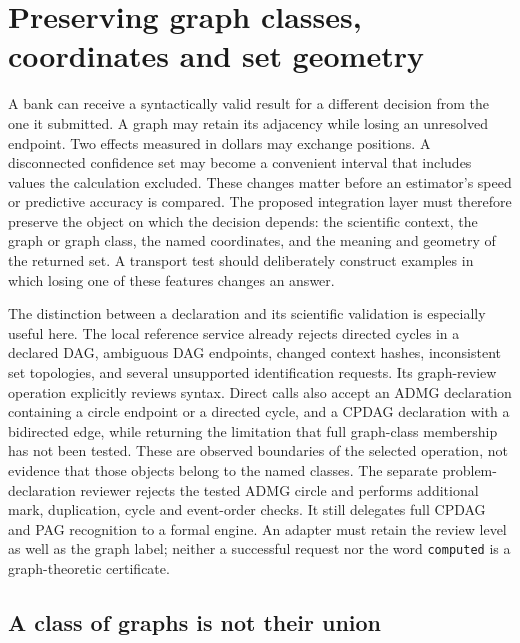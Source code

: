 \section{Preserving graph classes, coordinates and set geometry}
\label{exec16:topology}

A bank can receive a syntactically valid result for a different decision from
the one it submitted. A graph may retain its adjacency while losing an
unresolved endpoint. Two effects measured in dollars may exchange positions.
A disconnected confidence set may become a convenient interval that includes
values the calculation excluded. These changes matter before an estimator's
speed or predictive accuracy is compared. The proposed integration layer must
therefore preserve the object on which the decision depends: the scientific
context, the graph or graph class, the named coordinates, and the meaning and
geometry of the returned set. A transport test should deliberately construct
examples in which losing one of these features changes an answer.

The distinction between a declaration and its scientific validation is
especially useful here. The local reference service already rejects directed
cycles in a declared DAG, ambiguous DAG endpoints, changed context hashes,
inconsistent set topologies, and several unsupported identification requests.
Its graph-review operation explicitly reviews syntax. Direct calls also accept
an ADMG declaration containing a circle endpoint or a directed cycle, and a
CPDAG declaration with a bidirected edge, while returning the limitation that
full graph-class membership has not been tested. These are observed boundaries
of the selected operation, not evidence that those objects belong to the named
classes. The separate problem-declaration reviewer rejects the tested ADMG
circle and performs additional mark, duplication, cycle and event-order checks.
It still delegates full CPDAG and PAG recognition to a formal engine. An adapter
must retain the review level as well as the graph label; neither a successful
request nor the word \texttt{computed} is a graph-theoretic certificate.
\citep{exec16_topology_runtime}

\subsection{A class of graphs is not their union}

